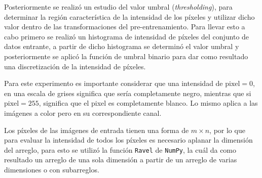 Posteriormente se realizó un estudio del valor umbral (\emph{thresholding}), para determinar la región característica de la intensidad de los píxeles y utilizar dicho valor dentro de las transformaciones del pre-entrenamiento. Para llevar esto a cabo primero se realizó un histograma de intensidad de píxeles del conjunto de datos entrante, a partir de dicho histograma se determinó el valor umbral y posteriormente se aplicó la función de umbral binario para dar como resultado una discretización de la intensidad de píxeles.

Para este experimento es importante considerar que una intensidad de $\text{pixel} = 0$, en una escala de grises significa que sería completamente negro, mientras que si $\text{pixel} = 255$, significa que el pixel es completamente blanco. Lo mismo aplica a las imágenes a color pero en su correspondiente canal.

Los píxeles de las imágenes de entrada tienen una forma de $m \times n$, por lo que para evaluar la intensidad de todos los píxeles es necesario aplanar la dimensión del arreglo, para esto se utilizó la función \texttt{Ravel} de \texttt{NumPy}, la cuál da como resultado un arreglo de una sola dimensión a partir de un arreglo de varias dimensiones o con subarreglos.

